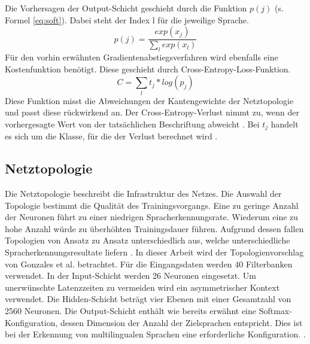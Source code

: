  Die Vorhersagen der Output-Schicht geschieht durch die Funktion $p(j)$  (s. Formel \ref{eq:soft}). Dabei steht der Index l für die jeweilige Sprache.
\begin{equation}
p(j)= \frac{ exp(x_{j}) }{\sum_{l}{}{ exp(x_{l})} }
\label{eq:soft}
\end{equation}
Für den vorhin erwähnten Gradientenabstiegsverfahren wird ebenfalls eine Kostenfunktion benötigt. Diese geschieht durch Cross-Entropy-Loss-Funktion. 
\begin{equation}
C= \sum_{l}{}{ t_{j} * log(p_{j})} 
\label{eq:back}
\end{equation}
Diese Funktion misst die Abweichungen der Kantengewichte der Netztopologie und passt diese rückwirkend an. Der Cross-Entropy-Verlust nimmt zu, wenn der vorhergesagte Wert von der tatsächlichen Beschriftung abweicht \cite{MLCheatsheet.2017}. Bei $t_{j}$ handelt es sich um die Klasse, für die der Verlust berechnet wird \cite{GonzalezDominguez.2015}.

\subsection{Netztopologie}
Die Netztopologie beschreibt die Infrastruktur des Netzes. Die Auswahl der Topologie bestimmt die Qualität des Trainingsvorgangs. Eine zu geringe Anzahl der Neuronen führt zu einer niedrigen Spracherkennungsrate. Wiederum eine zu hohe Anzahl würde zu überhöhten Trainingsdauer führen. Aufgrund dessen fallen Topologien von Ansatz zu Ansatz unterschiedlich aus, welche unterschiedliche Spracherkennungsresultate liefern \cite{bishop.2006}. In dieser Arbeit wird der Topologienvorschlag von Gonzales et al. betrachtet. Für die Eingangsdaten werden 40 Filterbanken verwendet. In der Input-Schicht werden 26 Neuronen eingesetzt. Um unerwünschte Latenzzeiten zu vermeiden wird ein asymmetrischer Kontext verwendet. Die Hidden-Schicht beträgt vier Ebenen mit einer Gesamtzahl von 2560 Neuronen. Die Output-Schicht enthält wie bereits erwähnt eine Softmax-Konfiguration, dessen Dimension der Anzahl der Zielsprachen entspricht. Dies ist bei der Erkennung von multilingualen Sprachen eine erforderliche Konfiguration. \cite{GonzalezDominguez.2015}.
 
